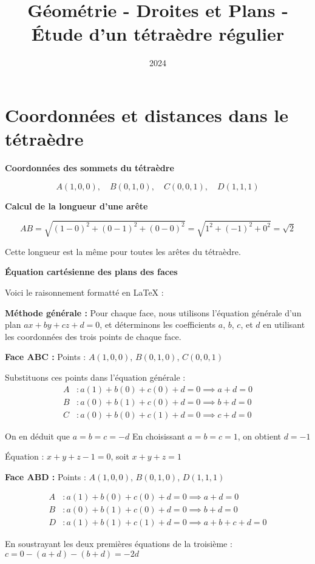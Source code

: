 \documentclass[10pt,a4paper]{article}
\title{Géométrie - Droites et Plans - Étude d'un tétraèdre régulier}
\author{}
\date{2024}
\begin{document}
\section{Coordonnées et distances dans le tétraèdre}

\q \textbf{Coordonnées des sommets du tétraèdre}

\[
A(1,0,0), \quad B(0,1,0), \quad C(0,0,1),  \quad D(1,1,1)
\]


\q \textbf{Calcul de la longueur d'une arête}

$$
AB = \sqrt{(1-0)^2 + (0-1)^2 + (0-0)^2} = \sqrt{1^2 + (-1)^2 + 0^2} = \sqrt{2}
$$

Cette longueur est la même pour toutes les arêtes du tétraèdre.


\q \textbf{Équation cartésienne des plans des faces}

Voici le raisonnement formatté en LaTeX :

\textbf{Méthode générale :}
Pour chaque face, nous utilisons l'équation générale d'un plan $ax + by + cz + d = 0$, et déterminons les coefficients $a$, $b$, $c$, et $d$ en utilisant les coordonnées des trois points de chaque face.

\textbf{Face ABC :}
Points : $A(1,0,0)$, $B(0,1,0)$, $C(0,0,1)$

Substituons ces points dans l'équation générale :
\begin{align*}
A &: a(1) + b(0) + c(0) + d = 0 \implies a + d = 0 \\
B &: a(0) + b(1) + c(0) + d = 0 \implies b + d = 0 \\
C &: a(0) + b(0) + c(1) + d = 0 \implies c + d = 0
\end{align*}

On en déduit que $a = b = c = -d$
En choisissant $a = b = c = 1$, on obtient $d = -1$

Équation : $x + y + z - 1 = 0$, soit $x + y + z = 1$

\textbf{Face ABD :}
Points : $A(1,0,0)$, $B(0,1,0)$, $D(1,1,1)$

\begin{align*}
A &: a(1) + b(0) + c(0) + d = 0 \implies a + d = 0 \\
B &: a(0) + b(1) + c(0) + d = 0 \implies b + d = 0 \\
D &: a(1) + b(1) + c(1) + d = 0 \implies a + b + c + d = 0
\end{align*}

En soustrayant les deux premières équations de la troisième :
$c = 0 - (a + d) - (b + d) = -2d$
\end{document}
